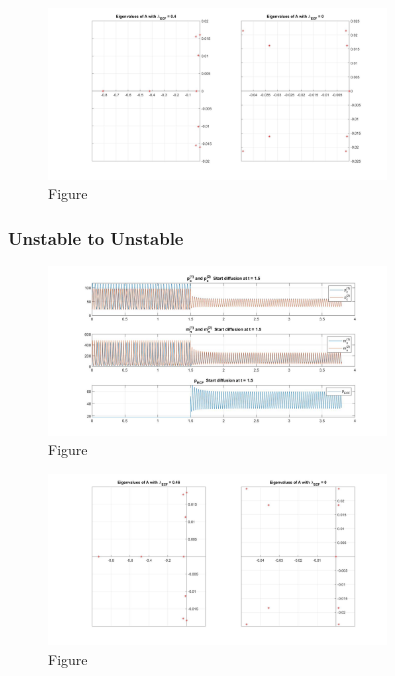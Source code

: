 \documentclass[12pt]{article}
\renewcommand{\(}{\left (}
\renewcommand{\)}{\right )}
\begin{document}
\begin{figure}[ht]
    \centering
	\begin{minipage}{0.99\textwidth}
		\centering
		\includegraphics[width=0.8\textwidth]{SSEi.jpg}
		\caption*{\small Figure}
	\end{minipage}
\end{figure}


\subsubsection{Unstable to Unstable}

\begin{figure}[ht]
    \centering
	\begin{minipage}{0.99\textwidth}
		\centering
		\includegraphics[width=0.8\textwidth]{UU.jpg}
		\caption*{\small Figure}
	\end{minipage}
\end{figure}

\begin{figure}[ht]
    \centering
	\begin{minipage}{0.99\textwidth}
		\centering
		\includegraphics[width=0.8\textwidth]{UUEi.jpg}
		\caption*{\small Figure}
	\end{minipage}
\end{figure}
\end{document}
